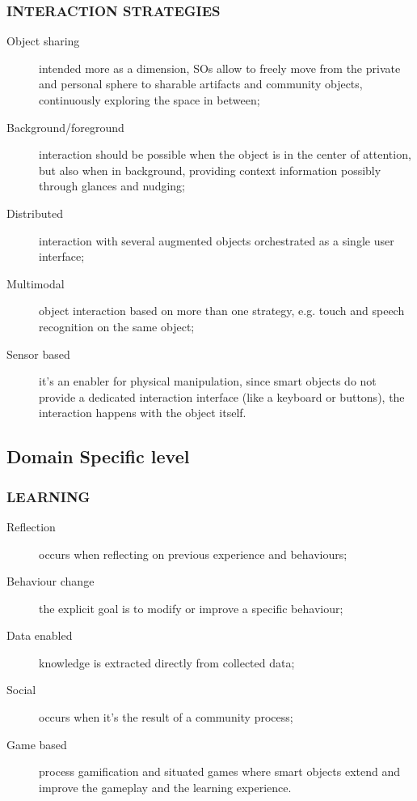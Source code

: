 \subsubsection{INTERACTION STRATEGIES}
\begin{description}
\item [Object sharing] intended more as a dimension, SOs allow to freely move from the private and personal sphere to sharable artifacts and community objects, continuously exploring the space in between;
\item [Background/foreground] interaction should be possible when the object is in the center of attention, but also when in background, providing context information possibly through glances and nudging;
\item [Distributed] interaction with several augmented objects orchestrated as a single user interface;
\item [Multimodal] object interaction based on more than one strategy, e.g. touch and speech recognition on the same object;
\item [Sensor based] it's an enabler for physical manipulation, since smart objects do not provide a dedicated interaction interface (like a keyboard or buttons), the interaction happens with the object itself.
\end{description}


\subsection{Domain Specific level}
\medskip

\subsubsection{LEARNING}
\begin{description}
\item [Reflection] occurs when reflecting on previous experience and behaviours;
\item [Behaviour change] the explicit goal is to modify or improve a specific behaviour;
\item [Data enabled] knowledge is extracted directly from collected data;
\item [Social] occurs when it's the result of a community process;
\item [Game based] process gamification and situated games where smart objects extend and improve the gameplay and the learning experience.
\end{description}

